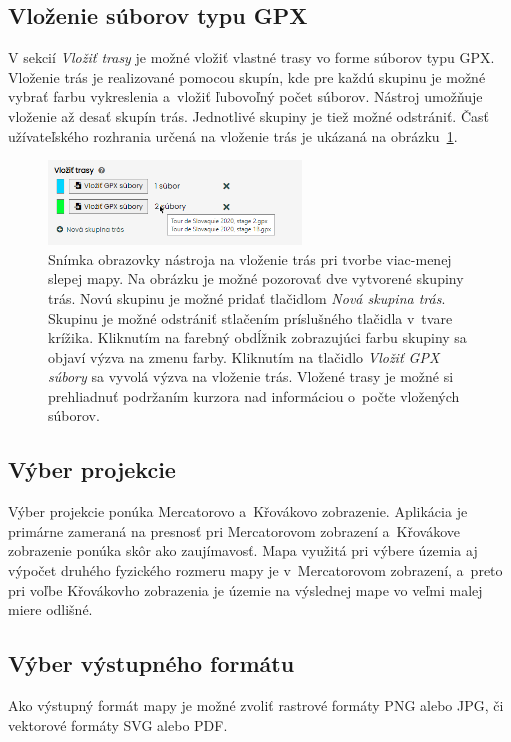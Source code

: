 \subsection*{Vloženie súborov typu GPX}
V sekcií {\it Vložiť trasy} je možné vložiť vlastné trasy vo forme súborov typu GPX. Vloženie trás je realizované pomocou skupín, kde pre každú skupinu je možné vybrať farbu vykreslenia a~vložiť ľubovoľný počet súborov. Nástroj umožňuje vloženie až desať skupín trás. Jednotlivé skupiny je tiež možné odstrániť. Časť užívateľského rozhrania určená na vloženie trás je ukázaná na obrázku~\ref{img_import_gpx}.

\begin{figure}[hbt]
	\centering
	\includegraphics[width=0.6\textwidth]{obrazky-figures/img_import_gpx.png}
	\caption{Snímka obrazovky nástroja na vloženie trás pri tvorbe viac-menej slepej mapy. Na obrázku je možné pozorovať dve vytvorené skupiny trás. Novú skupinu je možné pridať tlačidlom {\it Nová skupina trás}. Skupinu je možné odstrániť stlačením príslušného tlačidla v~tvare krížika. Kliknutím na farebný obdĺžnik zobrazujúci farbu skupiny sa objaví výzva na zmenu farby. Kliknutím na tlačidlo {\it Vložiť GPX súbory} sa vyvolá výzva na vloženie trás. Vložené trasy je možné si prehliadnuť podržaním kurzora nad informáciou o~počte vložených súborov.}
	\label{img_import_gpx}
\end{figure}

\subsection*{Výber projekcie}
Výber projekcie ponúka Mercatorovo a~Křovákovo zobrazenie. Aplikácia je primárne zameraná na presnosť pri Mercatorovom zobrazení a~Křovákove zobrazenie ponúka skôr ako zaujímavosť. Mapa využitá pri výbere územia aj výpočet druhého fyzického rozmeru mapy je v~Mercatorovom zobrazení, a~preto pri voľbe Křovákovho zobrazenia je územie na výslednej mape vo veľmi malej miere odlišné.

\subsection*{Výber výstupného formátu}
Ako výstupný formát mapy je možné zvoliť rastrové formáty PNG alebo JPG, či vektorové formáty SVG alebo PDF.

